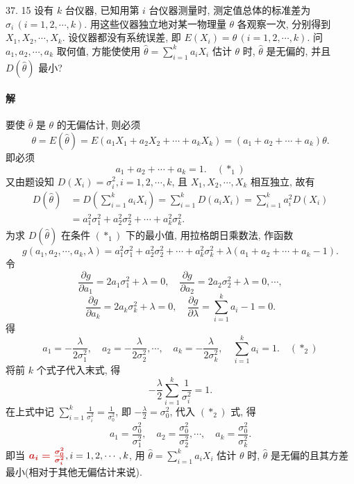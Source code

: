 \documentclass[11pt, UTF8]{ctexart}
\newcommand{\ans}[1]{{\color{fred}\boldsymbol{#1}}}
\begin{document}
\vspace{1.5em}

\begin{problem}{3}{7. 15}
设有 \(k\) 台仪器, 已知用第 \(i\) 台仪器测量时, 测定值总体的标准差为 \(\sigma_i \, (i=1, 2, \cdots, k)\). 用这些仪器独立地对某一物理量 \(\theta\) 各观察一次, 分别得到 \(X_1, X_2, \cdots, X_k\). 设仪器都没有系统误差, 即 \(E(X_i) = \theta \, (i=1, 2, \cdots, k)\). 问 \(a_1, a_2, \cdots, a_k\) 取何值, 方能使使用 \(\hat{\theta} = \sum_{i=1}^k a_i X_i\) 估计 \(\theta\) 时, \(\hat{\theta}\) 是无偏的, 并且 \(D(\hat{\theta})\) 最小?
\end{problem}

\paragraph{\color{fblue}解}
要使 \(\hat{\theta}\) 是 \(\theta\) 的无偏估计, 则必须
\[ \theta = E(\hat{\theta}) = E(a_1 X_1 + a_2 X_2 + \cdots + a_k X_k) = (a_1 + a_2 + \cdots + a_k)\theta. \]
即必须
\[ a_1 + a_2 + \cdots + a_k = 1. \quad (*_1) \]
又由题设知 \(D(X_i) = \sigma_i^2, i=1, 2, \cdots, k\), 且 \(X_1, X_2, \cdots, X_k\) 相互独立, 故有
\begin{align*}
D(\hat{\theta}) &= D\left(\sum_{i=1}^k a_i X_i\right) = \sum_{i=1}^k D(a_i X_i) = \sum_{i=1}^k a_i^2 D(X_i) \\
&= a_1^2 \sigma_1^2 + a_2^2 \sigma_2^2 + \cdots + a_k^2 \sigma_k^2.
\end{align*}
为求 \(D(\hat{\theta})\) 在条件 \((*_1)\) 下的最小值, 用拉格朗日乘数法, 作函数
\[ g(a_1, a_2, \cdots, a_k, \lambda) = a_1^2 \sigma_1^2 + a_2^2 \sigma_2^2 + \cdots + a_k^2 \sigma_k^2 + \lambda(a_1 + a_2 + \cdots + a_k - 1). \]
令
\[ \frac{\partial g}{\partial a_1} = 2a_1 \sigma_1^2 + \lambda = 0, \quad \frac{\partial g}{\partial a_2} = 2a_2 \sigma_2^2 + \lambda = 0, \cdots, \]
\[ \frac{\partial g}{\partial a_k} = 2a_k \sigma_k^2 + \lambda = 0, \quad \frac{\partial g}{\partial \lambda} = \sum_{i=1}^k a_i - 1 = 0. \]
得
\[ a_1 = -\frac{\lambda}{2\sigma_1^2}, \quad a_2 = -\frac{\lambda}{2\sigma_2^2}, \cdots, \quad a_k = -\frac{\lambda}{2\sigma_k^2}, \quad \sum_{i=1}^k a_i = 1. \quad (*_2) \]
将前 \(k\) 个式子代入末式, 得
\[ -\frac{\lambda}{2}\sum_{i=1}^k \frac{1}{\sigma_i^2} = 1. \]
在上式中记 \(\sum_{i=1}^k \frac{1}{\sigma_i^2} = \frac{1}{\sigma_0^2}\), 即 \(-\frac{\lambda}{2} = \sigma_0^2\), 代入 \((*_2)\) 式, 得
\[ a_1 = \frac{\sigma_0^2}{\sigma_1^2}, \quad a_2 = \frac{\sigma_0^2}{\sigma_2^2}, \cdots, \quad a_k = \frac{\sigma_0^2}{\sigma_k^2}. \]
即当 \(\ans{a_i = \frac{\sigma_0^2}{\sigma_i^2}}, i=1, 2, \cdots, k\), 用 \(\hat{\theta} = \sum_{i=1}^k a_i X_i\) 估计 \(\theta\) 时, \(\hat{\theta}\) 是无偏的且其方差最小(相对于其他无偏估计来说).
\end{document}
